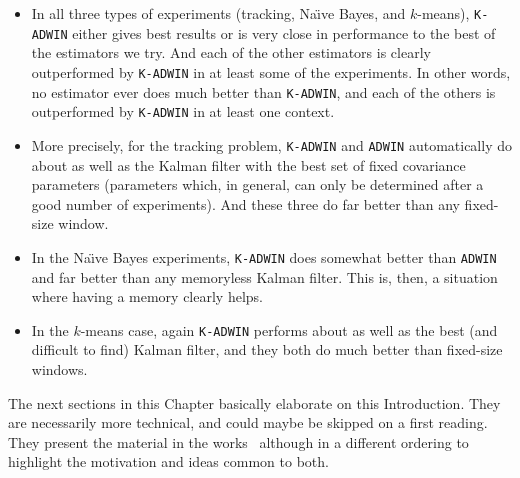 \begin{itemize}
\item In all three types of experiments (tracking, Na\"\i ve Bayes, and $k$-means), 
{\tt K-ADWIN} either gives best results or is very close in performance to the best 
of the estimators we try. And each of the other estimators is 
clearly outperformed by {\tt K-ADWIN}
in at least some of the experiments. In other words, no estimator ever does
much better than {\tt K-ADWIN}, and each of the others 
is outperformed by {\tt K-ADWIN} in at least one context. 
\item More precisely, for the tracking problem, {\tt K-ADWIN} and {\tt ADWIN} automatically
do about as well as the Kalman filter with the best set of fixed covariance parameters
(parameters which, in general, can only be determined after a good number of experiments). 
And these three do far better than any fixed-size window. 
\item In the Na\"\i ve Bayes experiments, {\tt K-ADWIN} does somewhat better than
{\tt ADWIN} and far better than any memoryless Kalman filter. This is, then, 
a situation where having a memory clearly helps. 
\item In the $k$-means case, again {\tt K-ADWIN} performs about as well 
as the best (and difficult to find) Kalman filter, 
and they both do much better than fixed-size windows.
\end{itemize}
\ENDOMIT

{\change
The next sections in this Chapter basically elaborate on this Introduction. They are necessarily more technical, and could maybe be skipped on a first reading. They present the material in the works~\cite{Kbif-gav,bif-gav} %
although in a different ordering to highlight the motivation and ideas common to both.
}

